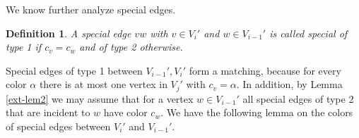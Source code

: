 \documentclass{article}
\newtheorem{defn}[theorem]{Definition}
\newtheorem{fact}[theorem]{Fact}
\begin{document}
We know further analyze special edges.
\begin{defn}
A special edge $vw$ with $v\in V_{i}'$ and $w\in V_{i-1}'$ is called {\it special of type 1} if $c_v=c_w$ and of {\it type 2} otherwise.
\end{defn}
Special edges of type 1 between $V_{i-1}', V_i'$ form a matching, because for every color $\alpha$ there is at most one vertex in $V_j'$ with $c_v=\alpha$. In addition, by Lemma \ref{ext-lem2} we may assume that for a vertex $w\in V_{i-1}'$ all special edges of type 2 that are incident to $w$ have color $c_w.$ We have the following lemma on the colors of special edges between $V_i'$ and $V_{i-1}'$. 
\end{document}
